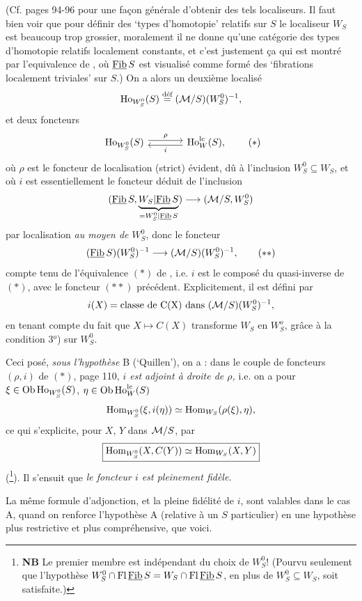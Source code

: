 (Cf. pages 94-96 pour une façon générale d'obtenir des tels localiseurs. Il faut bien voir que pour définir des ‘types d'homotopie’ relatifs sur $S$ le localiseur $W_S$ est beaucoup trop grossier, moralement il ne donne qu'une catégorie des types d'homotopie relatifs localement constants, et c'est justement ça qui est montré par l'equivalence de  , où $\underline{\mathrm{Fib}}\, S$ est visualisé comme formé des ‘fibrations localement triviales’ sur $S$.) On a alors un deuxième localisé %
\[\mathrm{Ho}_{W_S^0}(S) \overset{\text{déf}}{=} (\mathcal{M}/S)(W_S^0)^{-1},\]
et deux foncteurs
\[
\begin{tikzcd}[column sep=large]
\Ho_{W_S^0}(S) \arrow[r, shift left, "\rho"] & \Ho^{\mathrm{lc}}_W(S), \arrow[l, shift left, "i"]
\end{tikzcd}
\tag*{$(*)$}
\]
où $\rho$ est le foncteur de localisation (strict) évident, dû à l'inclusion $W_S^0 \subseteq W_S$, et où $i$ est
essentiellement le foncteur déduit de l'inclusion
\[(\underline{\mathrm{Fib}}\, S, \underbrace{W_S|\underline{\mathrm{Fib}}\, S}_{=W_S^0|\underline{\mathrm{Fib}}\, S}) \longrightarrow (\mathcal{M}/S, W_S^0)\]
par localisation \textit{au moyen de $W_S^0$}, donc le foncteur
\[(\underline{\mathrm{Fib}}\, S)(W_S^0)^{-1} \longrightarrow (\mathcal{M}/S)(W_S^0)^{-1}, \tag*{$(**)$}\]
compte tenu de l'équivalence $(*)$ de  , i.e. $i$ est le composé du quasi-inverse de $(*)$, avec le foncteur $(**)$ précédent. Explicitement, il est défini par
\[i(X) = \text{classe de C(X) dans } (\mathcal{M}/S)(W_S^0)^{-1},\]
en tenant compte du fait que $X \longmapsto C(X)$ transforme $W_S$ en $W_S^o$, grâce à la condition 3$^o$) sur $W_S^0$. %

Ceci posé, \textit{sous l'hypothèse} B (‘Quillen’), on a : dans le couple de foncteurs $(\rho, i)$ de $(*)$, page 110, \textit{$i$ est adjoint à droite de $\rho$,} i.e. on a pour $\xi \in \mathrm{Ob}\,\mathrm{Ho}_{W_S^0}(S)$, $\eta \in \mathrm{Ob}\,\mathrm{Ho}^{\mathrm{lc}}_W(S)$
\[\operatorname{Hom}_{W_S^0}(\xi, i(\eta)) \simeq \operatorname{Hom}_{W_S}(\rho(\xi), \eta),\]
ce qui s'explicite, pour $X$, $Y$ dans $\mathcal{M}/S$, par
\[\boxed{\operatorname{Hom}_{W_S^0}(X, C(Y)) \simeq \operatorname{Hom}_{W_S}(X, Y)}\]
(\footnote{\textbf{NB} Le premier membre est indépendant du choix de $W_S^0$! (Pourvu seulement que l'hypothèse $W_S^0 \cap \mathrm{Fl}\,\underline{\mathrm{Fib}}\, S = W_S \cap \mathrm{Fl}\,\underline{\mathrm{Fib}}\, S$, en plus de $W_S^0 \subseteq W_S$, soit satisfaite.)}). Il s'ensuit que \textit{le foncteur $i$ est pleinement fidèle.}

La même formule d'adjonction, et la
pleine fidélité de $i$, sont valables dans le cas A, quand on renforce l'hypothèse A (relative à un $S$ particulier) en une hypothèse plus restrictive et plus compréhensive, que voici.

